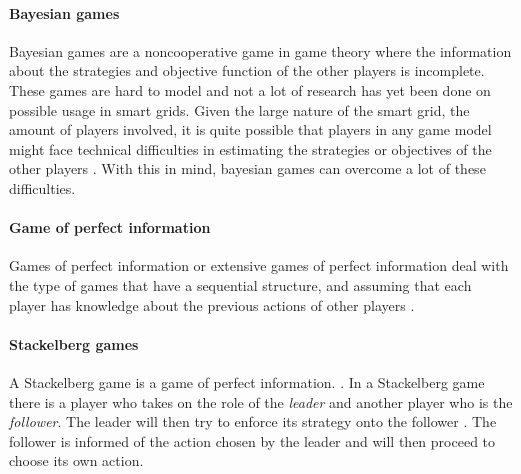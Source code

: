 \paragraph{Bayesian games}
Bayesian games are a noncooperative game in game theory where the information about the strategies and objective function of the other players is incomplete. These games are hard to model and not a lot of research has yet been done on possible usage in smart grids. Given the large nature of the smart grid, the amount of players involved, it is quite possible that players in any game model might face technical difficulties in estimating the strategies or objectives of the other players \cite{keypaper}. With this in mind, bayesian games can overcome a lot of these difficulties. 

\paragraph{Game of perfect information}
Games of perfect information or extensive games of perfect information deal with the type of games that have a sequential structure, and assuming that each player has knowledge about the previous actions of other players \cite{CourseInGameTheory}.

\paragraph{Stackelberg games}
A Stackelberg game is a game of perfect information. \cite{CourseInGameTheory}.
In a Stackelberg game there is a player who takes on the role of the \textit{leader} and another player who is the \textit{follower}. The leader will then try to enforce its strategy onto the follower \cite{ShohamLeyton-Brown2008}. The follower is informed of the action chosen by the leader and will then proceed to choose its own action.